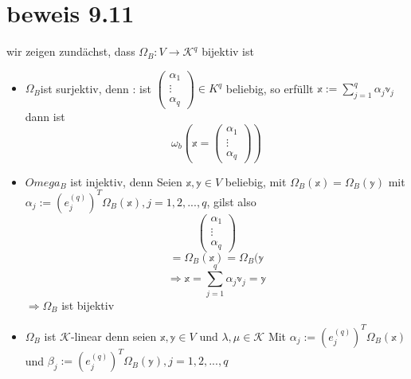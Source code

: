 \documentclass[11pt]{article}
\begin{document}
\section{beweis 9.11}
wir zeigen zundächst, dass $\Omega_B: V \rightarrow \mathcal{K}^q$ bijektiv ist 
\begin{itemize}
 \item $\Omega_B $ist surjektiv, denn : ist 
 $
 \begin{pmatrix}
  \alpha_1\\ \vdots\\ \alpha_q
 \end{pmatrix}
\in K^q
 $
 beliebig, so erfüllt $\mathbb{x}:= \sum_{j=1}^{q}\alpha_j \mathbb{v}_j$ dann ist 
\[ \omega_b(\mathbb{x}=
 \begin{pmatrix}
  \alpha_1\\ \vdots\\ \alpha_q
 \end{pmatrix})
 \]
 \item $Omega_B$ ist injektiv, denn Seien $\mathbb{x,y}\in V$ beliebig, mit $\Omega_B(\mathbb{x})=\Omega_B(\mathbb{y})$
 mit $\alpha_j := (e_j^(q))^T\Omega_B(\mathbb{x}), j=1,2,..., q$, gilst also  
 \[
 \begin{pmatrix}
  \alpha_1\\ \vdots\\ \alpha_q
 \end{pmatrix}\]
\[ =\Omega_B(\mathbb{x})=\Omega_B(\mathbb{y}
\]
\[\Rightarrow \mathbb{x}=\sum_{j=1}^{q}\alpha_j \mathbb{v}_j= \mathbb{y}
\] $\Rightarrow \Omega_B$ ist bijektiv
 \item
 $\Omega_B $ ist $\mathcal{K}$-linear denn seien $\mathbb{x,y}\in V$ und $\lambda, \mu \in \mathcal{K}$ Mit $\alpha_j := (e_j^(q))^T\Omega_B(\mathbb{x})$ und $\beta_j:= (e_j^(q))^T\Omega_B(\mathbb{y}),j=1,2,..., q$
  

\end{itemize}
\end{document}
